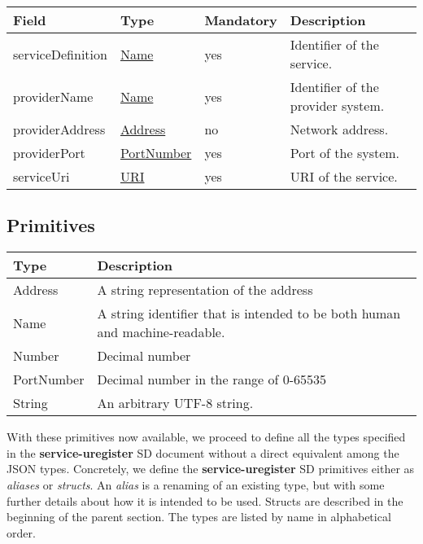 \documentclass[a4paper]{arrowhead}
\newcommand{\pdef}[1]{{\textcolor{ArrowheadGrey}{#1 \label{sec:model:primitives:#1} \label{sec:model:primitives:#1s}}}}
\newcommand{\pref}[1]{{\textcolor{ArrowheadGrey}{\hyperref[sec:model:primitives:#1]{#1}}}}
\begin{document}
\begin{table}[ht!]
\begin{tabularx}{\textwidth}{| p{3cm} | p{3cm} | p{2cm} | X |} \hline
\rowcolor{gray!33} Field & Type & Mandatory & Description \\ \hline
serviceDefinition &\pref{Name} & yes & Identifier of the service. \\ \hline
providerName & \pref{Name} & yes & Identifier of the provider system. \\ \hline
providerAddress & \pref{Address} & no & Network address. \\ \hline
providerPort &\pref{PortNumber} & yes & Port of the system. \\ \hline
serviceUri &\pref{URI} & yes & URI of the service. \\ \hline
\end{tabularx}
\end{table}

\newpage

\subsection{Primitives}
\label{sec:model:primitives}

\begin{table}[ht!]
\begin{tabularx}{\textwidth}{| p{3cm} | X |} \hline
\rowcolor{gray!33} Type & Description \\ \hline
\pdef{Address}          & A string representation of the address \\ \hline
\pdef{Name}             & A string identifier that is intended to be both human and machine-readable. \\ \hline
\pdef{Number}           & Decimal number \\ \hline
\pdef{PortNumber}       & Decimal number in the range of 0-65535 \\ \hline
\pdef{String}           & An arbitrary UTF-8 string. \\ \hline
\end{tabularx}
\end{table}

With these primitives now available, we proceed to define all the types specified in the \textbf{service-uregister} SD document without a direct equivalent among the JSON types.
Concretely, we define the \textbf{service-uregister} SD primitives either as \textit{aliases} or \textit{structs}.
An \textit{alias} is a renaming of an existing type, but with some further details about how it is intended to be used.
Structs are described in the beginning of the parent section.
The types are listed by name in alphabetical order.
\end{document}

